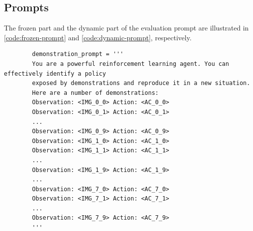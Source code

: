 \documentclass{article}
\newcommand{\ie}{i.e., }
\begin{document}
\subsection{Prompts}
\label{app:experimental-details:prompts}
The frozen part and the dynamic part of the evaluation prompt are illustrated in \cref{code:frozen-prompt} and \cref{code:dynamic-prompt}, respectively.
\begin{listing}
    \caption{
        The frozen part of the evaluation prompt, which contains the expert demonstration episodes and stays constant throughout an evaluation episode.
        In this example, we have 8 demonstration episodes with 10 steps each and RGB observations.
        Before feeding the prompt to the model, we replace the observation and action placeholders with the actual observations (\ie images in this case) and action strings.
    }
    \label{code:frozen-prompt}
   \begin{verbatim}
        demonstration_prompt = '''
        You are a powerful reinforcement learning agent. You can effectively identify a policy
        exposed by demonstrations and reproduce it in a new situation.
        Here are a number of demonstrations:
        Observation: <IMG_0_0> Action: <AC_0_0>
        Observation: <IMG_0_1> Action: <AC_0_1>
        ...
        Observation: <IMG_0_9> Action: <AC_0_9>
        Observation: <IMG_1_0> Action: <AC_1_0>
        Observation: <IMG_1_1> Action: <AC_1_1>
        ...
        Observation: <IMG_1_9> Action: <AC_1_9>
        ...
        Observation: <IMG_7_0> Action: <AC_7_0>
        Observation: <IMG_7_1> Action: <AC_7_1>
        ...
        Observation: <IMG_7_9> Action: <AC_7_9>
        '''
    \end{verbatim}
\end{listing}
\end{document}
